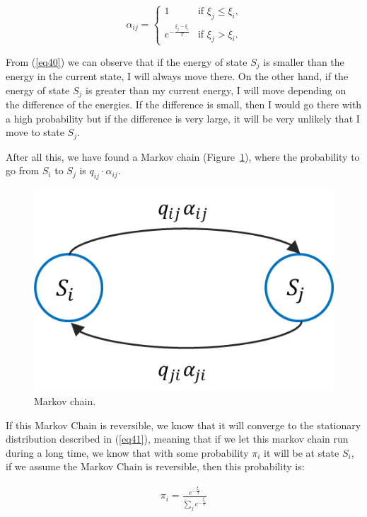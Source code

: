 \begin{equation}
\ \alpha_{ij} = 
\begin{cases}
1  & \mbox{if } \xi_{j} \leq \xi_{i},\\ 
e^{-\frac{\xi_{j}-\xi_{i}}{T}} & \mbox{if }\xi_{j} > \xi_{i}.
\end{cases}
\label{eq40}
\end{equation}

From (\ref{eq40}) we can observe that if the energy of state $S_j$ is smaller than the energy in the current state, I will always move there. On the other hand, if the energy of state $S_j$ is greater than my current energy, I will move depending on the difference of the energies. If the difference is small, then I would go there with a high probability but if the difference is very large, it will be very unlikely that I move to state $S_j$.

After all this, we have found a Markov chain (Figure~\ref{figur13}), where the probability to go from $S_i$ to $S_j$ is $q_{ij}\cdot \alpha_{ij}$.

\begin{figure}[h!]
\centering
\includegraphics[scale=.5]{markovChain}
\caption{Markov chain.}
\label{figur13}
\end{figure}

If this Markov Chain is reversible, we know that it will converge to the stationary distribution described in (\ref{eq41}), meaning that if we let this markov chain run during a long time, we know that with some probability $\pi_i$ it will be at state $S_i$, if we assume the Markov Chain is reversible, then this probability is:

\begin{equation}
\begin{aligned}
\pi_i = \frac{e^{-{\frac{\xi_i}{T}}}}{\sum_j e^{-\frac{\xi_j}{T}}}
\end{aligned}
\label{eq41}
\end{equation}


